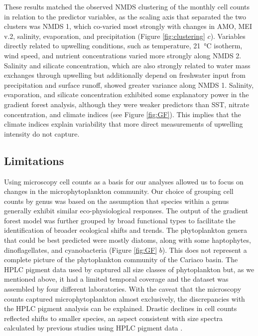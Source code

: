 \documentclass[draft]{agujournal2019}
\begin{document}
    These results matched the observed NMDS clustering of the monthly cell counts in relation to the predictor variables, as the scaling axis that separated the two clusters was NMDS 1, which co-varied most strongly with changes in AMO, MEI v.2, salinity, evaporation, and precipitation (Figure \ref{fig:clustering} $c$). Variables directly related to upwelling conditions, such as temperature, \qty{21}{\celsius} isotherm, wind speed, and nutrient concentrations varied more strongly along NMDS 2. Salinity and silicate concentration, which are also strongly related to water mass exchanges through upwelling but additionally depend on freshwater input from precipitation and surface runoff, showed greater variance along NMDS 1. Salinity, evaporation, and silicate concentration exhibited some explanatory power in the gradient forest analysis, although they were weaker predictors than SST, nitrate concentration, and climate indices (see Figure \ref{fig:GF}). This implies that the climate indices explain variability that more direct measurements of upwelling intensity do not capture. 
    

\subsection{Limitations}
    
    Using microscopy cell counts as a basis for our analyses allowed us to focus on changes in the microphytoplankton community. Our choice of grouping cell counts by genus was based on the assumption that species within a genus generally exhibit similar eco-physiological responses. The output of the gradient forest model was further grouped by broad functional types to facilitate the identification of broader ecological shifts and trends. The phytoplankton genera that could be best predicted were mostly diatoms, along with some haptophytes, dinoflagellates, and cyanobacteria (Figure \ref{fig:GF} $b$). This does not represent a complete picture of the phytoplankton community of the Cariaco basin. The HPLC pigment data used by  captured all size classes of phytoplankton but, as we mentioned above, it had a limited temporal coverage and the dataset was assembled by four different laboratories. With the caveat that the microscopy counts captured microphytoplankton almost exclusively, the discrepancies with the HPLC pigment analysis can be explained. Drastic declines in cell counts reflected shifts to smaller species, an aspect consistent with size spectra calculated by previous studies using HPLC pigment data \cite{lorenzoni_characterization_2015}.
    
\end{document}
